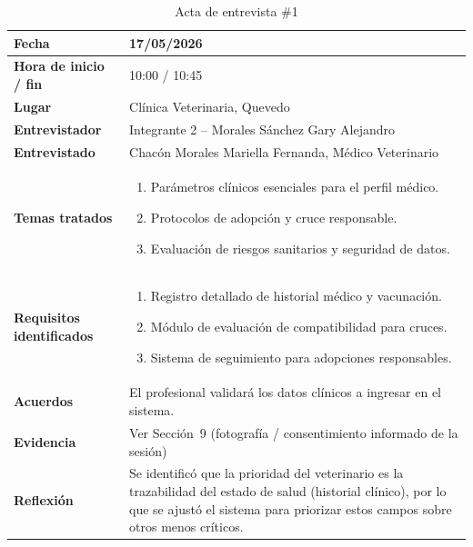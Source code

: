 \documentclass[journal,onecolumn]{IEEEtran}
\begin{document}
\begin{table}[H]
	\caption{Acta de entrevista \#1}
	\label{tab:acta_entrevista}
	\begin{tabularx}{\textwidth}{|l|X|}
		\hline
		\textbf{Fecha}           & 17/05/2026 \\
		\hline
		\textbf{Hora de inicio / fin}  & 10:00 / 10:45 \\
		\hline
		\textbf{Lugar}           & Clínica Veterinaria, Quevedo \\
		\hline
		\textbf{Entrevistador}   & Integrante 2 -- Morales Sánchez Gary Alejandro \\
		\hline
		\textbf{Entrevistado}    & Chacón Morales Mariella Fernanda, Médico Veterinario \\
		\hline
		\textbf{Temas tratados}  & \begin{enumerate}[leftmargin=*,topsep=0pt,partopsep=0pt,parsep=0pt,itemsep=0pt]
			\item Parámetros clínicos esenciales para el perfil médico.
			\item Protocolos de adopción y cruce responsable.
			\item Evaluación de riesgos sanitarios y seguridad de datos.
		\end{enumerate} \\
		\hline
		\textbf{Requisitos identificados} & \begin{enumerate}[leftmargin=*,topsep=0pt,partopsep=0pt,parsep=0pt,itemsep=0pt]
			\item Registro detallado de historial médico y vacunación.
			\item Módulo de evaluación de compatibilidad para cruces.
			\item Sistema de seguimiento para adopciones responsables.
		\end{enumerate} \\
		\hline
		\textbf{Acuerdos}        & El profesional validará los datos clínicos a ingresar en el sistema. \\
		\hline
		\textbf{Evidencia}       & Ver Sección~9 (fotografía / consentimiento informado de la sesión) \\
		\hline
		\textbf{Reflexión}       & Se identificó que la prioridad del veterinario es la trazabilidad
		del estado de salud (historial clínico), por lo que se ajustó el
		sistema para priorizar estos campos sobre otros menos críticos. \\
		\hline
	\end{tabularx}
\end{table}
\end{document}
